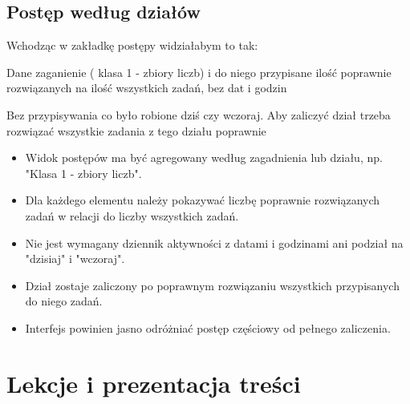 \documentclass[12pt,a4paper]{report}
\begin{document}
\section{Postęp według działów}
\begin{ElearnReviewComment}[title={Komentarz nr 10 -- Anna Kogut, 2026-07-22}]
Wchodząc w zakładkę postępy widziałabym to tak:

Dane zaganienie ( klasa 1 - zbiory liczb)  i do niego przypisane ilość poprawnie rozwiązanych na ilość wszystkich zadań, bez dat i godzin

Bez przypisywania co było robione dziś czy wczoraj. Aby zaliczyć dział trzeba rozwiązać wszystkie zadania z tego działu poprawnie
\end{ElearnReviewComment}
\begin{ElearnRequirement}[title={Wymagania wynikające z komentarza}]
\begin{itemize}
  \item Widok postępów ma być agregowany według zagadnienia lub działu, np. "Klasa 1 - zbiory liczb".
  \item Dla każdego elementu należy pokazywać liczbę poprawnie rozwiązanych zadań w relacji do liczby wszystkich zadań.
  \item Nie jest wymagany dziennik aktywności z datami i godzinami ani podział na "dzisiaj" i "wczoraj".
  \item Dział zostaje zaliczony po poprawnym rozwiązaniu wszystkich przypisanych do niego zadań.
  \item Interfejs powinien jasno odróżniać postęp częściowy od pełnego zaliczenia.
\end{itemize}
\end{ElearnRequirement}
\clearpage
\chapter{Lekcje i prezentacja treści}
\end{document}
